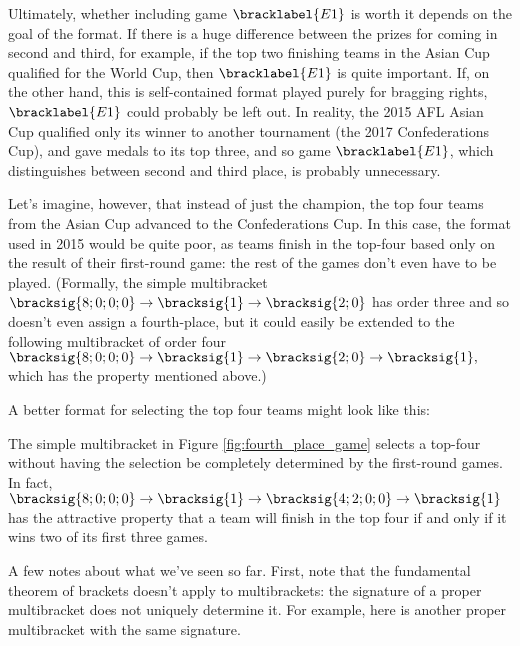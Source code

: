 {    Ultimately, whether including game $\bracklabel{E1}$ is worth it depends on the goal of the format. If there is a huge difference between the prizes for coming in second and third, for example, if the top two finishing teams in the Asian Cup qualified for the World Cup, then $\bracklabel{E1}$ is quite important. If, on the other hand, this is self-contained format played purely for bragging rights, $\bracklabel{E1}$ could probably be left out. In reality, the 2015 AFL Asian Cup qualified only its winner to another tournament (the 2017 Confederations Cup), and gave medals to its top three, and so game $\bracklabel{E1}$, which distinguishes between second and third place, is probably unnecessary.

    Let's imagine, however, that instead of just the champion, the top four teams from the Asian Cup advanced to the Confederations Cup. In this case, the format used in 2015 would be quite poor, as teams finish in the top-four based only on the result of their first-round game: the rest of the games don't even have to be played. (Formally, the simple multibracket $\bracksig{8;0;0;0} \to \bracksig{1} \to \bracksig{2; 0}$ has order three and so doesn't even assign a fourth-place, but it could easily be extended to the following multibracket of order four $\bracksig{8;0;0;0} \to \bracksig{1} \to \bracksig{2; 0} \to \bracksig{1},$ which has the property mentioned above.)
    
    A better format for selecting the top four teams might look like this:


    The simple multibracket in Figure \ref{fig:fourth_place_game} selects a top-four without having the selection be completely determined by the first-round games. In fact, $\bracksig{8;0;0;0} \to \bracksig{1} \to \bracksig{4; 2; 0; 0} \to \bracksig{1}$ has the attractive property that a team will finish in the top four if and only if it wins two of its first three games.

    A few notes about what we've seen so far. First, note that the fundamental theorem of brackets doesn't apply to multibrackets: the signature of a proper multibracket does not uniquely determine it. For example, here is another proper multibracket with the same signature.


}
